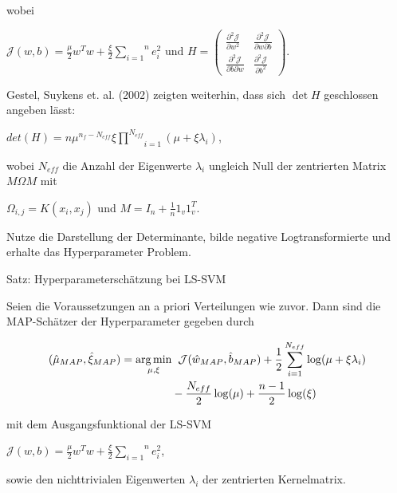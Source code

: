 \documentclass{beamer}
\begin{document}
{\begin{frame}
wobei 
\begin{center}
	$\mathcal{J}(w,b) = \frac{\mu}{2}w^T w + \frac{\xi}{2}\overset{n}{\underset{i=1}			{\sum}} e_i ^2 \text{ und } H = \begin{pmatrix}
	\frac{\partial^2 \mathcal{J}}{\partial w^2 } & \frac{\partial^2 \mathcal{J}}				{\partial w \partial b } \\
	\frac{\partial^2 \mathcal{J}}{\partial b \partial w } & \frac{\partial^2 					\mathcal{J}}{\partial b^2 }
	\end{pmatrix}.$
\end{center}
\end{frame}


\begin{frame}

Gestel, Suykens et. al. (2002) zeigten weiterhin, dass sich $\det H $ geschlossen angeben lässt:

\begin{center}
$det(H) = n \mu^{n_f - N_{eff}} \xi \underset{i=1}{\overset{N_{eff}}{\prod}}(\mu + \xi \lambda_i)$,
\end{center}

wobei $N_{eff}$ die Anzahl der Eigenwerte $\lambda_i$ ungleich Null der zentrierten Matrix $M \Omega M$ mit
\begin{center}
$\Omega_{i,j} = K(x_i, x_j)$ und $M = I_n + \frac{1}{n} 1_v 1_v^T$.
\end{center}
Nutze die Darstellung der Determinante, bilde negative Logtransformierte und erhalte das Hyperparameter Problem.
\end{frame}


\begin{frame}
\begin{block}{Satz: Hyperparameterschätzung bei LS-SVM}

Seien die Voraussetzungen an a priori Verteilungen wie zuvor. Dann sind die MAP-Schätzer der Hyperparameter gegeben durch

\begin{align}
	(\hat{\mu}_{MAP}, \hat{\xi}_{MAP}) = \underset{\mu, \xi}{\arg \min} & \hspace{0.2cm}\mathcal{J}(\hat{w}_{MAP}, \hat{b}_{MAP}) + \frac{1}{2}\sum_{i=1}^{N_{eff}}\log(\mu + \xi \lambda_i) \\
	&- \frac{N_{eff}}{2}\log(\mu) + \frac{n -1 }{2}\log(\xi)
\end{align}



mit dem Ausgangsfunktional der LS-SVM 
\begin{center}
$\mathcal{J}(w,b) = \frac{\mu}{2}w^T w + \frac{\xi}{2}\overset{n}{\underset{i=1}{\sum}} e_i ^2$,
\end{center}
sowie den nichttrivialen Eigenwerten $\lambda_i$ der zentrierten Kernelmatrix.
\end{block}


\end{frame}}
\end{document}
